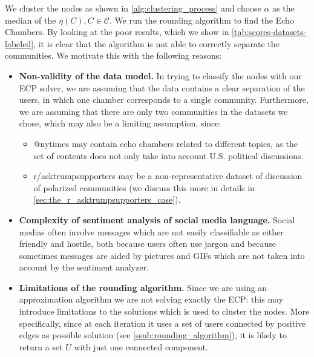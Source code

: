 We cluster the nodes as shown in \autoref{alg:clustering_process}
and choose $\alpha $ as the median of the $\eta(C), C \in \mathcal{C} $. We run
the rounding algorithm to find the Echo Chambers. By
looking at the poor results, which we show in
\autoref{tab:scores-datasets-labeled}, it is clear that the algorithm is not
able to correctly separate the communities. We motivate this with the following
reasons:
\begin{itemize}
	\item \textbf{Non-validity of the data model.} In trying to classify the
	      nodes with our \acrshort{ECP} solver, we are assuming that the data
	      contains a clear separation of the users, in which one chamber
	      corresponds to a single community. Furthermore, we are assuming that
	      there are only two communities in the datasets we chose, which may also
	      be a limiting assumption, since:
	      \begin{itemize}
		      \item @nytimes may contain echo chambers related to different
		            topics, as the set of contents does not only take into account
		            U.S. political discussions.
		      \item r/asktrumpsupporters may be a non-representative
		            dataset of discussion of polarized communities (we
		            discuss this more in details in
		            \autoref{sec:the_r_asktrumpsupporters_case}).
	      \end{itemize}
	\item \textbf{Complexity of sentiment analysis of social media language.}
	      Social medias often involve messages which are not easily classifiable
	      as either friendly and hostile, both because users often use jargon
	      and because sometimes messages are aided by pictures and GIFs which
	      are not taken into account by the sentiment analyzer.
	\item \textbf{Limitations of the rounding algorithm.} Since we are
	      using an approximation algorithm we are not solving exactly the
	      \acrshort{ECP}: this may introduce limitations to the solutions which
	      is used to cluster the nodes. More specifically, since at each iteration it uses a set of users
	      connected by positive edges as possible solution (see
	      \autoref{ssub:rounding_algorithm}), it is likely to return
	      a set $U$ with just one connected component.

\end{itemize}
